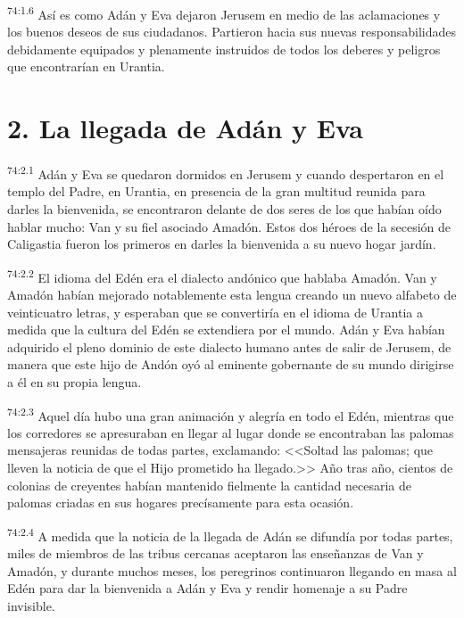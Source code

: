 \par
\textsuperscript{74:1.6} Así es como Adán y Eva dejaron Jerusem en medio de las aclamaciones y los buenos deseos de sus ciudadanos. Partieron hacia sus nuevas responsabilidades debidamente equipados y plenamente instruidos de todos los deberes y peligros que encontrarían en Urantia.

\section*{2. La llegada de Adán y Eva}
\par
\textsuperscript{74:2.1} Adán y Eva se quedaron dormidos en Jerusem y cuando despertaron en el templo del Padre, en Urantia, en presencia de la gran multitud reunida para darles la bienvenida, se encontraron delante de dos seres de los que habían oído hablar mucho: Van y su fiel asociado Amadón. Estos dos héroes de la secesión de Caligastia fueron los primeros en darles la bienvenida a su nuevo hogar jardín.

\par
\textsuperscript{74:2.2} El idioma del Edén era el dialecto andónico que hablaba Amadón. Van y Amadón habían mejorado notablemente esta lengua creando un nuevo alfabeto de veinticuatro letras, y esperaban que se convertiría en el idioma de Urantia a medida que la cultura del Edén se extendiera por el mundo. Adán y Eva habían adquirido el pleno dominio de este dialecto humano antes de salir de Jerusem, de manera que este hijo de Andón oyó al eminente gobernante de su mundo dirigirse a él en su propia lengua.

\par
\textsuperscript{74:2.3} Aquel día hubo una gran animación y alegría en todo el Edén, mientras que los corredores se apresuraban en llegar al lugar donde se encontraban las palomas mensajeras reunidas de todas partes, exclamando: <<Soltad las palomas; que lleven la noticia de que el Hijo prometido ha llegado.>> Año tras año, cientos de colonias de creyentes habían mantenido fielmente la cantidad necesaria de palomas criadas en sus hogares precísamente para esta ocasión.

\par
\textsuperscript{74:2.4} A medida que la noticia de la llegada de Adán se difundía por todas partes, miles de miembros de las tribus cercanas aceptaron las enseñanzas de Van y Amadón, y durante muchos meses, los peregrinos continuaron llegando en masa al Edén para dar la bienvenida a Adán y Eva y rendir homenaje a su Padre invisible.

